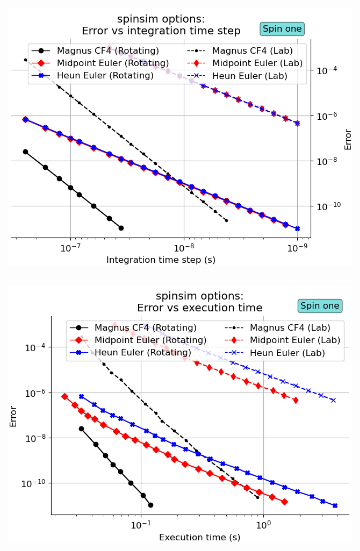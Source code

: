 \documentclass{jors}
\begin{document}
		\begin{figure}[h!]
			\begin{subfigure}[b]{0.475\textwidth}
				\includegraphics[scale=0.475]{benchmark_spin_one_step_error.png}
				\caption{}
				\label{fig:benchmark_spin_one_step_error}
			\end{subfigure}
			\hfill
			\begin{subfigure}[b]{0.475\textwidth}
				\includegraphics[scale=0.475]{benchmark_spin_one_execution_error.png}
				\caption{}
				\label{fig:benchmark_spin_one_execution_error}
			\end{subfigure}

\end{figure}
\end{document}
